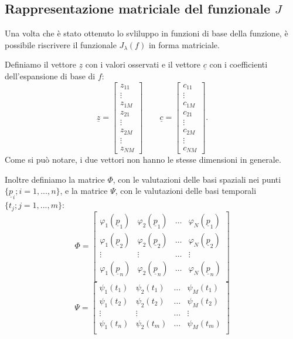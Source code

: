 \documentclass[a4paper,11pt,twoside,openright]{book}							%
\begin{document}
\subsection*{Rappresentazione matriciale del funzionale $J$}
Una volta che è stato ottenuto lo svliluppo in funzioni di base della funzione, è possibile riscrivere il funzionale $J_\lambda (f)$ in forma matriciale.

Definiamo il vettore $\underline z$ con i valori osservati e il vettore $\underline c$ con i coefficienti dell'espansione di base di $f$:
\begin{equation}
\underline z =
\begin{bmatrix}
z_{11}  \\
\vdots\\
z_{1M}  \\
z_{21}  \\
\vdots\\
z_{2M}  \\
\vdots\\
z_{NM}
\end{bmatrix}
\qquad
\underline c =
\begin{bmatrix}
c_{11}  \\
\vdots\\
c_{1M}  \\
c_{21}  \\
\vdots\\
c_{2M}  \\
\vdots\\
c_{NM}
\end{bmatrix}.
\end{equation}
Come si può notare, i due vettori non hanno le stesse dimensioni in generale.

Inoltre definiamo la matrice $\Phi$, con le valutazioni delle basi spaziali nei punti $\{\underline p_i; i = 1,...,n\}$, e la matrice $\Psi$, con le valutazioni delle basi temporali $\{t_j; j = 1,...,m\}$:
$$
\Phi =
\begin{bmatrix}
\varphi_{1}(\underline p_1) & \varphi_{2}(\underline p_1) & \hdots & \varphi_{N}(\underline p_1)  \\
\varphi_{1}(\underline p_2) & \varphi_{2}(\underline p_2) & \hdots & \varphi_{N}(\underline p_2)  \\
\vdots & \vdots & \hdots & \vdots \\
\varphi_{1}(\underline p_n) & \varphi_{2}(\underline p_n) & \hdots & \varphi_{N}(\underline p_n)  \\
\end{bmatrix}
$$
$$
\Psi = 
\begin{bmatrix}
\psi_{1}( t_1) & \psi_{2}( t_1) & \hdots & \psi_{M}( t_1)  \\
\psi_{1}( t_2) & \psi_{2}( t_2) & \hdots & \psi_{M}( t_2)  \\
\vdots & \vdots & \hdots & \vdots \\
\psi_{1}( t_n) & \psi_{2}( t_m) & \hdots & \psi_{M}( t_m)  \\
\end{bmatrix}
$$
\end{document}
